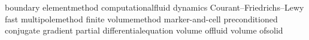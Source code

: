
 {boundary element}{method}
 {computational}{fluid dynamics}
 {Courant--Friedrichs--Lewy} %
 {fast multipole}{method}
 {finite volume}{method}
 {marker-and-cell}%
 {preconditioned conjugate gradient}
 {partial differential}{equation}
\def            \PDEs {\mbox{\PDE\qsi}}
 {volume of}{fluid}
 {volume of}{solid}


